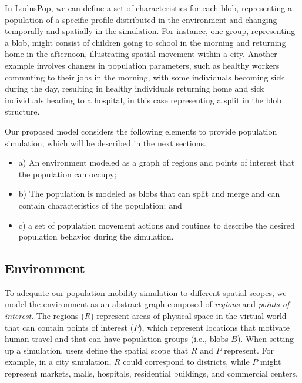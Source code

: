 \documentclass[pdflatex,sn-mathphys-num]{sn-jnl}%
\theoremstyle{thmstyleone}%
\theoremstyle{thmstyletwo}%
\theoremstyle{thmstylethree}%
\begin{document}
In LodusPop, we can define a set of characteristics for each blob, representing a population of a specific profile distributed in the environment and changing temporally and spatially in the simulation. For instance, one group, representing a blob, might consist of children going to school in the morning and returning home in the afternoon, illustrating spatial movement within a city. Another example involves changes in population parameters, such as healthy workers commuting to their jobs in the morning, with some individuals becoming sick during the day, resulting in healthy individuals returning home and sick individuals heading to a hospital, in this case representing a split in the blob structure.

Our proposed model considers the following elements to provide population simulation, which will be described in the next sections. 
\begin{itemize}
    \item a) An environment modeled as a graph of regions and points of interest that the population can occupy;
    \item b) The population is modeled as blobs that can split and merge and can contain characteristics of the population; and
    \item c) a set of population movement actions and routines to describe the desired population behavior during the simulation.
\end{itemize} 

\subsection{Environment}
\label{sec:environment}

To adequate our population mobility simulation to different spatial scopes, we model the environment as an abstract graph composed of \textit{regions} and \textit{points of interest}. The regions ($R$) represent areas of physical space in the virtual world that can contain points of interest ($P$), which represent locations that motivate human travel and that can have population groups (i.e., blobs $B$). 
When setting up a simulation, users define the spatial scope that $R$ and $P$ represent. For example, in a city simulation, $R$ could correspond to districts, while $P$ might represent markets, malls, hospitals, residential buildings, and commercial centers. 
\end{document}
